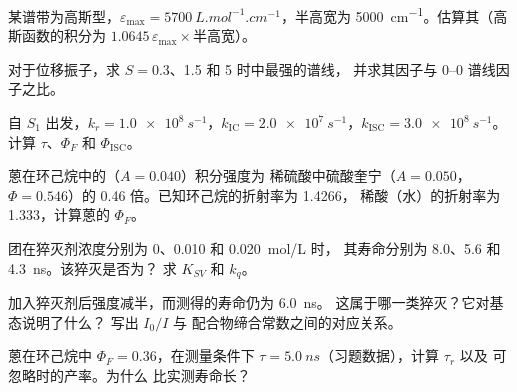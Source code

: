 \begin{exercise}[$\star\star$]\label{exo:b3:electronic-spectroscopy:5}
某谱带为高斯型，$\varepsilon_{\max} = \qty{5700}{L.mol^{-1}.cm^{-1}}$，半高宽为
\qty{5000}{cm^{-1}}。估算其（高斯函数的积分为
$1.0645\,\varepsilon_{\max}\times$半高宽）。
\end{exercise}

\begin{exercise}[$\star\star$]\label{exo:b3:electronic-spectroscopy:6}
对于位移振子，求 $S = 0.3$、1.5 和 5 时中最强的谱线，
并求其因子与 0--0 谱线因子之比。
\end{exercise}

\begin{exercise}[$\star\star$]\label{exo:b3:electronic-spectroscopy:7}
自 $S_1$ 出发，$k_r = \qty{1.0e8}{s^{-1}}$，$k_{\mathrm{IC}} = \qty{2.0e7}{s^{-1}}$，$k_{\mathrm{ISC}} =
\qty{3.0e8}{s^{-1}}$。计算 $\tau$、$\Phi_F$ 和 $\Phi_{\mathrm{ISC}}$。
\end{exercise}

\begin{exercise}[$\star\star$]\label{exo:b3:electronic-spectroscopy:8}
蒽在环己烷中的（$A = 0.040$）积分强度为
稀硫酸中硫酸奎宁（$A = 0.050$，$\Phi =
0.546$）的 0.46 倍。已知环己烷的折射率为 1.4266，
稀酸（水）的折射率为 1.333，计算蒽的 $\Phi_F$。
\end{exercise}

\begin{exercise}[$\star\star$]\label{exo:b3:electronic-spectroscopy:9}
团在猝灭剂浓度分别为 0、0.010 和 \qty{0.020}{mol/L} 时，
其寿命分别为 8.0、5.6 和 \qty{4.3}{ns}。该猝灭是否为？
求 $K_{SV}$ 和 $k_q$。
\end{exercise}

\begin{exercise}[$\star\star\star$]\label{exo:b3:electronic-spectroscopy:10}
加入猝灭剂后强度减半，而测得的寿命仍为 \qty{6.0}{ns}。
这属于哪一类猝灭？它对基态说明了什么？
写出 $I_0/I$ 与
配合物缔合常数之间的对应关系。
\end{exercise}

\begin{exercise}[$\star\star\star$]\label{exo:b3:electronic-spectroscopy:11}
蒽在环己烷中 $\Phi_F = 0.36$，在测量条件下
$\tau = \qty{5.0}{ns}$（习题数据），计算 $\tau_r$ 以及
可忽略时的产率。为什么
比实测寿命长？
\end{exercise}

